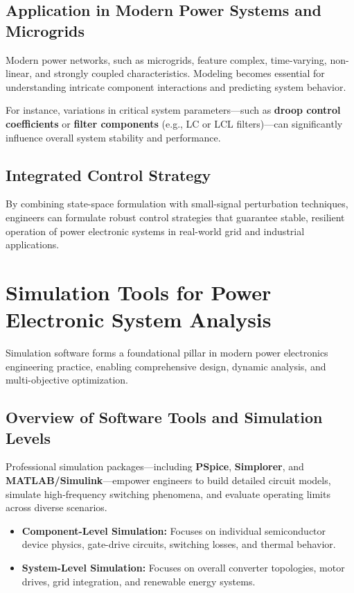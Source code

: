 \documentclass[12pt,a4paper]{article}
\begin{document}
\subsection{Application in Modern Power Systems and Microgrids}
Modern power networks, such as microgrids, feature complex, time-varying, non-linear, and strongly coupled characteristics. Modeling becomes essential for understanding intricate component interactions and predicting system behavior. 

For instance, variations in critical system parameters---such as \textbf{droop control coefficients} or \textbf{filter components} (e.g., LC or LCL filters)---can significantly influence overall system stability and performance.

\subsection{Integrated Control Strategy}
By combining state-space formulation with small-signal perturbation techniques, engineers can formulate robust control strategies that guarantee stable, resilient operation of power electronic systems in real-world grid and industrial applications.

\section{Simulation Tools for Power Electronic System Analysis}

Simulation software forms a foundational pillar in modern power electronics engineering practice, enabling comprehensive design, dynamic analysis, and multi-objective optimization.

\subsection{Overview of Software Tools and Simulation Levels}
Professional simulation packages---including \textbf{PSpice}, \textbf{Simplorer}, and \textbf{MATLAB/Simulink}---empower engineers to build detailed circuit models, simulate high-frequency switching phenomena, and evaluate operating limits across diverse scenarios.

\begin{itemize}
    \item \textbf{Component-Level Simulation:} Focuses on individual semiconductor device physics, gate-drive circuits, switching losses, and thermal behavior.
    \item \textbf{System-Level Simulation:} Focuses on overall converter topologies, motor drives, grid integration, and renewable energy systems.
\end{itemize}
\end{document}
